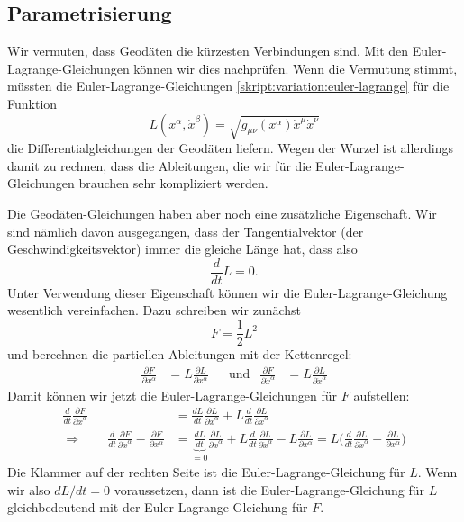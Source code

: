 \subsection{Parametrisierung%
\label{skript:geodaeten:subsection:Parametrisierung}}
Wir vermuten, dass Geodäten die kürzesten Verbindungen sind.
Mit den Euler-Lagrange-Gleichungen können wir dies nachprüfen.
Wenn die Vermutung stimmt, müssten die Euler-Lagrange-Gleichungen 
\eqref{skript:variation:euler-lagrange}
für die Funktion
\[
L(x^\alpha, \dot x^\beta) =\sqrt{g_{\mu\nu}(x^\alpha)\dot x^\mu\dot x^\nu}
\]
die Differentialgleichungen der Geodäten liefern.
Wegen der Wurzel ist allerdings damit zu rechnen, dass die
Ableitungen, die wir für die Euler-Lagrange-Gleichungen brauchen sehr
kompliziert werden.

Die Geodäten-Gleichungen haben aber noch eine zusätzliche Eigenschaft.
Wir sind nämlich davon ausgegangen, dass der Tangentialvektor (der
Geschwindigkeitsvektor) immer die gleiche Länge hat, dass also
\[
\frac{d}{dt}L=0.
\]
Unter Verwendung dieser Eigenschaft können wir die Euler-Lagrange-Gleichung
wesentlich vereinfachen.
Dazu schreiben wir zunächst
\[
F=\frac12 L^2
\]
und berechnen die partiellen Ableitungen mit der Kettenregel:
\[
\begin{aligned}
\frac{\partial F}{\partial x^\alpha}
&=
L
\frac{\partial L}{\partial x^\alpha}
&&\text{und}
&
\frac{\partial F}{\partial \dot x^\alpha}
&=
L\frac{\partial L}{\partial\dot x^\alpha}
\end{aligned}
\]
Damit können wir jetzt die Euler-Lagrange-Gleichungen für $F$ aufstellen:
\begin{align*}
\frac{d}{dt}
\frac{\partial F}{\partial \dot x^\alpha}
&=
\frac{dL}{dt} \frac{\partial L}{\partial\dot x^\alpha}
+
L\frac{d}{dt}\frac{\partial L}{\partial\dot x^\alpha}
\\
\Rightarrow\qquad
\frac{d}{dt}
\frac{\partial F}{\partial \dot x^\alpha}
-
\frac{\partial F}{\partial x^\alpha}
&=
\underbrace{\frac{dL}{dt}}_{\displaystyle =0}
\frac{\partial L}{\partial\dot x^\alpha}
+
L\frac{d}{dt}\frac{\partial L}{\partial\dot x^\alpha}
-
L
\frac{\partial L}{\partial x^\alpha}
=
L\biggl(
\frac{d}{dt}\frac{\partial L}{\partial\dot x^\alpha}
-
\frac{\partial L}{\partial x^\alpha}
\biggr)
\end{align*}
Die Klammer auf der rechten Seite ist die Euler-Lagrange-Gleichung für
$L$.
Wenn wir also $dL/dt=0$ voraussetzen, dann ist die Euler-Lagrange-Gleichung
für $L$ gleichbedeutend mit der Euler-Lagrange-Gleichung für $F$.

